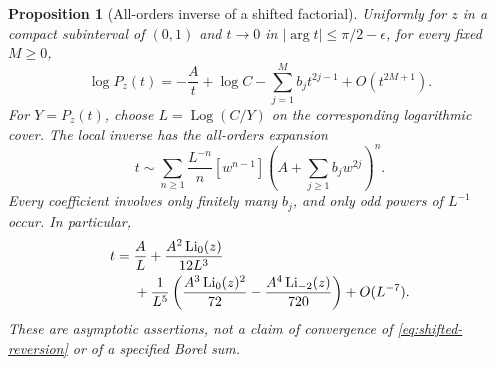 \documentclass[11pt,a4paper]{article}
\numberwithin{equation}{section}
\newtheorem{proposition}[theorem]{Proposition}
\theoremstyle{definition}\newtheorem{definition}[theorem]{Definition}
\theoremstyle{remark}\newtheorem{remark}[theorem]{Remark}
\newcommand{\Log}{\operatorname{Log}}\newcommand{\Li}{\operatorname{Li}}
\begin{document}
\begin{proposition}[All-orders inverse of a shifted factorial]
\label{prop:shifted}
Uniformly for $z$ in a compact subinterval of $(0,1)$ and $t\to0$ in
$|\arg t|\le\pi/2-\epsilon$, for every fixed $M\ge0$,
\begin{equation}\label{eq:shifted-asymptotic}
 \log P_z(t)=-\frac{A}{t}+\log C
             -\sum_{j=1}^M b_jt^{2j-1}+O(t^{2M+1}).
\end{equation}
For $Y=P_z(t)$, choose $L=\Log(C/Y)$ on the corresponding logarithmic
cover. The local inverse has the all-orders expansion
\begin{equation}\label{eq:shifted-reversion}
 t\sim\sum_{n\ge1}\frac{L^{-n}}{n}
       [w^{n-1}]\left(A+\sum_{j\ge1}b_jw^{2j}\right)^n.
\end{equation}
Every coefficient involves only finitely many $b_j$, and only odd powers
of $L^{-1}$ occur. In particular,
\begin{align}
 t={}&\frac{A}{L}+\frac{A^2\Li_0(z)}{12L^3}\notag\\
 &+\frac1{L^5}\left(
       \frac{A^3\Li_0(z)^2}{72}-\frac{A^4\Li_{-2}(z)}{720}\right)
       +O(L^{-7}).\label{eq:shifted-first}
\end{align}
These are asymptotic assertions, not a claim of convergence of
\eqref{eq:shifted-reversion} or of a specified Borel sum.
\end{proposition}
\end{document}
